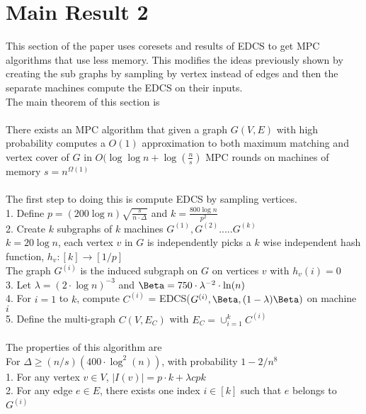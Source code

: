 \documentclass[12pt]{report}
\begin{document}
{\section{Main Result 2}
This section of the paper uses coresets and results of EDCS to get MPC algorithms that use less memory. This modifies the ideas previously shown by creating the sub graphs by sampling by vertex instead of edges and then the separate machines compute the EDCS on their inputs. \\
The main theorem of this section is \\ \\
There exists an MPC algorithm that given a graph $G(V, E)$ with high probability computes a $O(1)$ approximation to both maximum matching and vertex cover of $G$ in $O(\log \log n + \log( \frac{n}{s})$ MPC rounds on machines of memory $s = n^{\Omega(1)}$  \\ \\
The first step to doing this is compute EDCS by sampling vertices. \\
1. Define $p = (200 \log n) \sqrt{\frac{s}{n \cdot \Delta}}$ and $k = \frac{800 \log n}{p^2}$ \\
2. Create $k$ subgraphs of $k$ machines $G^{(1)}, G^{(2)}.....G^{(k)}$ \\
$k = 20 \log n$, each vertex $v$ in $G$ is independently picks a $k$ wise independent hash function, $h_v: [k] \to [1/p]$ \\
The graph $G^{(i)}$ is the induced subgraph on $G$ on vertices $v$ with $h_v(i) = 0$ \\
3. Let $\lambda = (2 \cdot \log n)^{-3}$ and $\Beta = 750 \cdot \lambda^{-2} \cdot \ln (n)$ \\
4. For $i = 1$ to $k$, compute $C^{(i)}$ = EDCS($G^{(i)}, \Beta, (1- \lambda)\Beta)$ on machine $i$ \\
5. Define the multi-graph $C(V, E_{C})$ with $E_{C} = \cup_{i=1}^k C^{(i)}$ \\ \\
The properties of this algorithm are \\
For $\Delta \geq (n/s)(400 \cdot \log^2(n))$, with probability $1-2/n^8$ \\
1. For any vertex $v \in V$, $|I(v)| =p \cdot k + \lambda c p k$ \\
2. For any edge $e \in E$, there exists one index $i \in [k]$ such that $e$ belongs to $G^{(i)}$


}
\end{document}

